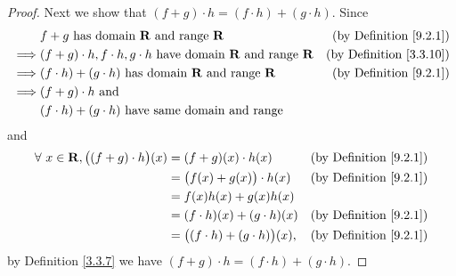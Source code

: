 \begin{proof}
    Next we show that \((f + g) \cdot h = (f \cdot h) + (g \cdot h)\).
    Since
    \begin{align*}
                 & f + g \text{ has domain } \mathbf{R} \text{ and range } \mathbf{R}                                   & \text{(by Definition \ref{9.2.1})}  \\
        \implies & (f + g) \cdot h, f \cdot h, g \cdot h  \text{ have domain } \mathbf{R} \text{ and range } \mathbf{R} & \text{(by Definition \ref{3.3.10})} \\
        \implies & (f \cdot h) + (g \cdot h)  \text{ has domain } \mathbf{R} \text{ and range } \mathbf{R}              & \text{(by Definition \ref{9.2.1})}  \\
        \implies & (f + g) \cdot h \text{ and }                                                                                                               \\
                 & (f \cdot h) + (g \cdot h) \text{ have same domain and range}
    \end{align*}
    and
    \begin{align*}
        \forall\ x \in \mathbf{R}, \big((f + g) \cdot h\big)(x) & = (f + g)(x) \cdot h(x)                   & \text{(by Definition \ref{9.2.1})} \\
                                                                & = \big(f(x) + g(x)\big) \cdot h(x)        & \text{(by Definition \ref{9.2.1})} \\
                                                                & = f(x)h(x) + g(x)h(x)                                                          \\
                                                                & = (f \cdot h)(x) + (g \cdot h)(x)         & \text{(by Definition \ref{9.2.1})} \\
                                                                & = \big((f \cdot h) + (g \cdot h)\big)(x), & \text{(by Definition \ref{9.2.1})}
    \end{align*}
    by Definition \ref{3.3.7} we have \((f + g) \cdot h = (f \cdot h) + (g \cdot h)\).


\end{proof}
